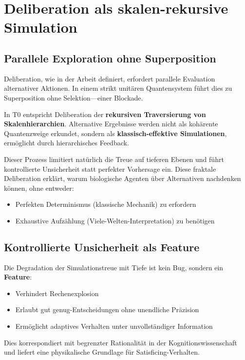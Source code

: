 	\section{Deliberation als skalen-rekursive Simulation}
	
	\subsection{Parallele Exploration ohne Superposition}
	
	Deliberation, wie in der Arbeit definiert, erfordert parallele Evaluation alternativer Aktionen. In einem strikt unitären Quantensystem führt dies zu Superposition ohne Selektion—einer Blockade.
	
	In T0 entspricht Deliberation der \textbf{rekursiven Traversierung von Skalenhierarchien}. Alternative Ergebnisse werden nicht als kohärente Quantenzweige erkundet, sondern als \textbf{klassisch-effektive Simulationen}, ermöglicht durch hierarchisches Feedback.
	
	Dieser Prozess limitiert natürlich die Treue auf tieferen Ebenen und führt kontrollierte Unsicherheit statt perfekter Vorhersage ein. Diese \glqq fraktale Deliberation\grqq{} erklärt, warum biologische Agenten über Alternativen nachdenken können, ohne entweder:
	
	\begin{itemize}
		\item Perfekten Determinismus (klassische Mechanik) zu erfordern
		\item Exhaustive Aufzählung (Viele-Welten-Interpretation) zu benötigen
	\end{itemize}
	
	\subsection{Kontrollierte Unsicherheit als Feature}
	
	Die Degradation der Simulationstreue mit Tiefe ist kein Bug, sondern ein \textbf{Feature}:
	
	\begin{itemize}
		\item Verhindert Rechenexplosion
		\item Erlaubt \glqq gut genug\grqq{}-Entscheidungen ohne unendliche Präzision
		\item Ermöglicht adaptives Verhalten unter unvollständiger Information
	\end{itemize}
	
	Dies korrespondiert mit begrenzter Rationalität in der Kognitionswissenschaft und liefert eine physikalische Grundlage für Satisficing-Verhalten.
	
